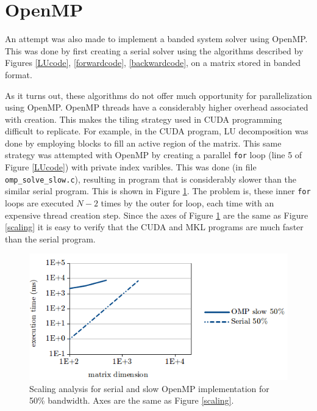 \documentclass[12pt]{article}
\begin{document}
\section{OpenMP}
\label{sec:omp}

An attempt was also made to implement a banded system solver using OpenMP. This
was done by first creating a serial solver using the algorithms described by
Figures \ref{LUcode}, \ref{forwardcode}, \ref{backwardcode}, on a matrix
stored in banded format.

As it turns out, these algorithms do not offer much opportunity for
parallelization using OpenMP. OpenMP threads have a considerably higher
overhead associated with creation. This makes the tiling  strategy used in CUDA
programming difficult to replicate.  For example, in the CUDA program, LU
decomposition was done by employing blocks to fill an active region of the
matrix. This same strategy was attempted with OpenMP by creating a parallel
\texttt{for} loop (line 5 of Figure \ref{LUcode}) with private index varibles.
This was done (in file \texttt{omp\_solve\_slow.c}), resulting in program that
is considerably slower than the similar serial program.  This is shown in
Figure \ref{slow}.  The problem is, these inner \texttt{for} loops are executed $N-2$
times by the outer for loop, each time with an expensive thread creation step.
Since the axes of Figure \ref{slow} are the same as Figure \ref{scaling} it is easy to
verify that the CUDA and MKL programs are much faster than the serial program.

\begin{figure}[H]
\caption{Scaling analysis for serial and slow OpenMP implementation for 50\% bandwidth. Axes are the same as Figure \ref{scaling}.}
\label{slow}
\centerline{\includegraphics[width=12cm]{slow.png}}
\end{figure}
\end{document}
